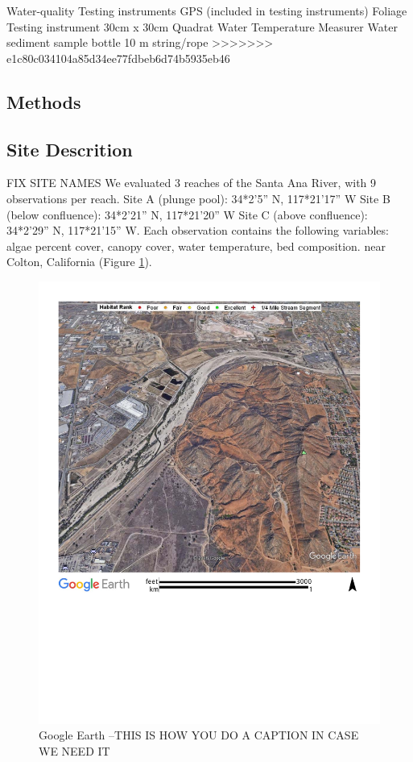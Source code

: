 \documentclass{article}
\begin{document}
Water-quality Testing instruments GPS (included in testing instruments) Foliage Testing instrument 30cm x 30cm Quadrat Water Temperature Measurer Water sediment sample bottle 10 m string/rope
>>>>>>> e1c80c034104a85d34ee77fdbeb6d74b5935eb46


\subsection{Methods}


\subsection{Site Descrition}

FIX SITE NAMES
We evaluated 3 reaches of the Santa Ana River, with 9 observations per reach. Site A (plunge pool): 34*2’5” N, 117*21’17” W Site B (below conﬂuence): 34*2’21” N, 117*21’20” W Site C (above conﬂuence): 34*2’29” N, 117*21’15” W. Each observation contains the following variables: algae percent cover, canopy cover, water temperature, bed composition. near Colton, California (Figure \ref{SAR_Image}). 

\begin{figure}
\includegraphics[width=1.00\textwidth]{Figures/SantaAna_SatelliteImage}
\caption{Google Earth --THIS IS HOW YOU DO A CAPTION IN CASE WE NEED IT}
\label{SAR_Image}
\end{figure}
\end{document}
